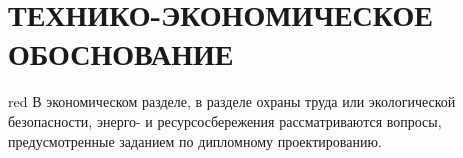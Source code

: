 \section[Технико-экономическое обоснование]{ТЕХНИКО-ЭКОНОМИЧЕСКОЕ ОБОСНОВАНИЕ}

\begin{color}{red}
  В экономическом разделе, в разделе охраны труда или экологической безопасности,
  энерго- и ресурсосбережения рассматриваются вопросы, предусмотренные
  заданием по дипломному проектированию.
\end{color}